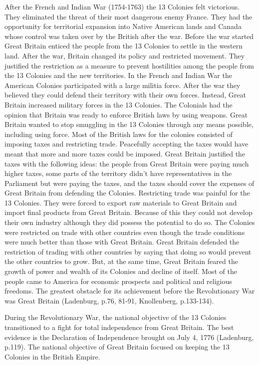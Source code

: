 After the French and Indian War (1754-1763) the 13 Colonies felt victorious.
They eliminated the threat of their most dangerous enemy France.  They had the
opportunity for territorial expansion into Native American lands and Canada
whose control was taken over by the British after the war.  Before the war
started Great Britain enticed the people from the 13 Colonies to settle in the
western land.  After the war, Britain changed its policy and restricted
movement.  They justified the restriction as a measure to prevent hostilities
among the people from the 13 Colonies and the new territories.  In the French
and Indian War the American Colonies participated with a large militia force.
After the war they believed they could defend their territory with their own
forces.  Instead, Great Britain increased military forces in the 13 Colonies.
The Colonials had the opinion that Britain was ready to enforce British laws by
using weapons.  Great Britain wanted to stop smuggling in the 13 Colonies
through any means possible, including using force.  Most of the British laws for
the colonies consisted of imposing taxes and restricting trade.  Peacefully
accepting the taxes would have meant that more and more taxes could be imposed.
Great Britain justified the taxes with the following ideas: the people from
Great Britain were paying much higher taxes, some parts of the territory didn’t
have representatives in the Parliament but were paying the taxes, and the taxes
should cover the expenses of Great Britain from defending the Colonies.
Restricting trade was painful for the 13 Colonies.  They were forced to export
raw materials to Great Britain and import final products from Great Britain.
Because of this they could not develop their own industry although they did
possess the potential to do so.  The Colonies were restricted on trade with
other countries even though the trade conditions were much better than those
with Great Britain.  Great Britain defended the restriction of trading with
other countries by saying that doing so would prevent the other countries to
grow.  But, at the same time, Great Britain feared the growth of power and
wealth of its Colonies and decline of itself.  Most of the people came to
America for economic prospects and political and religious freedoms.  The
greatest obstacle for its achievement before the Revolutionary War was Great
Britain (Ladenburg, p.76, 81-91, Knollenberg, p.133-134).

During the Revolutionary War, the national objective of the 13 Colonies
transitioned to a fight for total independence from Great Britain.  The best
evidence is the Declaration of Independence brought on July 4, 1776 (Ladenburg,
p.119).  The national objective of Great Britain focused on keeping the 13
Colonies in the British Empire.

